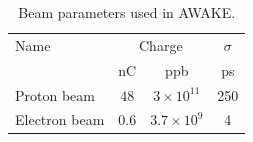 \begin{table}[h]
  \centering
    \begin{tabular}{l c c c}
    \toprule
    Name  & \multicolumn{2}{c}{Charge} & $\sigma$\\
          & nC & ppb & ps\\
    \midrule
    Proton beam								& $48$	  & $3\times10^{11}$	& 250	\\
    Electron beam							& $0.6$	  & $3.7\times10^{9}$	& 4		\\
    \bottomrule
    \end{tabular}
  \caption{Beam parameters used in AWAKE.} \label{beam_param_exp:tab}
\end{table}







% 




